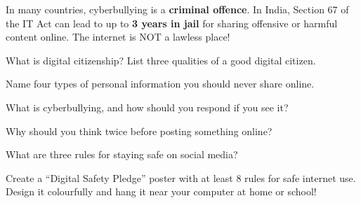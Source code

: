
\begin{funfact}
In many countries, cyberbullying is a \textbf{criminal offence}. In India, Section 67 of the IT Act can lead to up to \textbf{3 years in jail} for sharing offensive or harmful content online. The internet is NOT a lawless place!
\end{funfact}

\begin{reviewqs}
  \item What is digital citizenship? List three qualities of a good digital citizen.
  \item Name four types of personal information you should never share online.
  \item What is cyberbullying, and how should you respond if you see it?
  \item Why should you think twice before posting something online?
  \item What are three rules for staying safe on social media?
\end{reviewqs}

\begin{challenge}
Create a ``Digital Safety Pledge'' poster with at least 8 rules for safe internet use. Design it colourfully and hang it near your computer at home or school!
\end{challenge}
